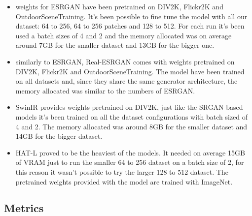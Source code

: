 \begin{itemize}
  \item weights for ESRGAN have been pretrained on  DIV2K\cite{Agustsson_2017_CVPR_Workshops}, Flickr2K\cite{Lim_2017_CVPR_Workshops} and OutdoorSceneTraining\cite{wang2018recovering}. It's been possible to fine tune the model with all our dataset: 64 to 256, 64 to 256 patches and 128 to 512. For each run it's been used a batch sizes of 4 and 2 and the memory allocated was on average around 7GB for the smaller dataset and 13GB for the bigger one.
  \item similarly to ESRGAN, Real-ESRGAN comes with weights pretrained on DIV2K, Flickr2K and OutdoorSceneTraining. The model have been trained on all datasets and, since they share the same generator architecture, the memory allocated was similar to the numbers of ESRGAN.
  \item SwinIR provides weights pretrained on DIV2K, just like the SRGAN-based models it's been trained on all the dataset configurations with batch sized of 4 and 2. The memory allocated was around 8GB for the smaller dataset and 14GB for the bigger dataset.
  \item HAT-L proved to be the heaviest of the models. It needed on average 15GB of VRAM just to run the smaller 64 to 256 dataset on a batch size of 2, for this reason it wasn't possible to try the larger 128 to 512 dataset. The pretrained weights provided with the model are trained with ImageNet\cite{deng2009imagenet}.
\end{itemize}

\subsection{Metrics}
\label{subsec:metrics}

